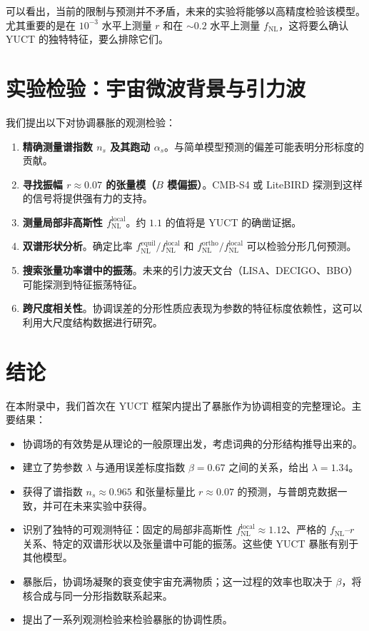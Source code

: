 \documentclass[12pt]{article}
\theoremstyle{remark}
\begin{document}
	可以看出，当前的限制与预测并不矛盾，未来的实验将能够以高精度检验该模型。尤其重要的是在 $10^{-3}$ 水平上测量 $r$ 和在 $\sim 0.2$ 水平上测量 $f_{\text{NL}}$，这将要么确认 YUCT 的独特特征，要么排除它们。
	
	\section{实验检验：宇宙微波背景与引力波}
	\label{sec:tests}
	
	我们提出以下对协调暴胀的观测检验：
	
	\begin{enumerate}
		\item \textbf{精确测量谱指数 $n_s$ 及其跑动 $\alpha_s$}。与简单模型预测的偏差可能表明分形标度的贡献。
		\item \textbf{寻找振幅 $r \approx 0.07$ 的张量模（$B$ 模偏振）}。CMB‑S4 或 LiteBIRD 探测到这样的信号将提供强有力的支持。
		\item \textbf{测量局部非高斯性 $f_{\text{NL}}^{\text{local}}$}。约 $1.1$ 的值将是 YUCT 的确凿证据。
		\item \textbf{双谱形状分析}。确定比率 $f_{\text{NL}}^{\text{equil}}/f_{\text{NL}}^{\text{local}}$ 和 $f_{\text{NL}}^{\text{ortho}}/f_{\text{NL}}^{\text{local}}$ 可以检验分形几何预测。
		\item \textbf{搜索张量功率谱中的振荡}。未来的引力波天文台（LISA、DECIGO、BBO）可能探测到特征振荡特征。
		\item \textbf{跨尺度相关性}。协调误差的分形性质应表现为参数的特征标度依赖性，这可以利用大尺度结构数据进行研究。
	\end{enumerate}
	
	\section{结论}
	\label{sec:conclusion}
	
	在本附录中，我们首次在 YUCT 框架内提出了暴胀作为协调相变的完整理论。主要结果：
	
	\begin{itemize}
		\item 协调场的有效势是从理论的一般原理出发，考虑词典的分形结构推导出来的。
		\item 建立了势参数 $\lambda$ 与通用误差标度指数 $\beta = 0.67$ 之间的关系，给出 $\lambda = 1.34$。
		\item 获得了谱指数 $n_s \approx 0.965$ 和张量标量比 $r \approx 0.07$ 的预测，与普朗克数据一致，并可在未来实验中获得。
		\item 识别了独特的可观测特征：固定的局部非高斯性 $f_{\text{NL}}^{\text{local}} \approx 1.12$、严格的 $f_{\text{NL}}$–$r$ 关系、特定的双谱形状以及张量谱中可能的振荡。这些使 YUCT 暴胀有别于其他模型。
		\item 暴胀后，协调场凝聚的衰变使宇宙充满物质；这一过程的效率也取决于 $\beta$，将核合成与同一分形指数联系起来。
		\item 提出了一系列观测检验来检验暴胀的协调性质。
	\end{itemize}
	
\end{document}
